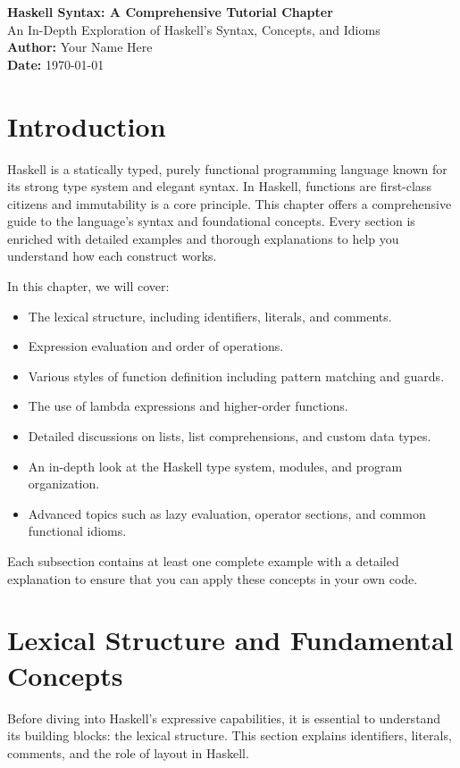 \documentclass[11pt,a4paper]{article}
\begin{document}
\begin{center}
  {\LARGE \textbf{Haskell Syntax: A Comprehensive Tutorial Chapter}}\\[1em]
  {\large An In-Depth Exploration of Haskell's Syntax, Concepts, and Idioms}\\[2em]
  \textbf{Author:} Your Name Here \\
  \textbf{Date:} \today
\end{center}

\newpage

\tableofcontents

\newpage

\section{Introduction}
Haskell is a statically typed, purely functional programming language known for its strong type system and elegant syntax. In Haskell, functions are first-class citizens and immutability is a core principle. This chapter offers a comprehensive guide to the language's syntax and foundational concepts. Every section is enriched with detailed examples and thorough explanations to help you understand how each construct works.

In this chapter, we will cover:
\begin{itemize}[noitemsep]
  \item The lexical structure, including identifiers, literals, and comments.
  \item Expression evaluation and order of operations.
  \item Various styles of function definition including pattern matching and guards.
  \item The use of lambda expressions and higher-order functions.
  \item Detailed discussions on lists, list comprehensions, and custom data types.
  \item An in-depth look at the Haskell type system, modules, and program organization.
  \item Advanced topics such as lazy evaluation, operator sections, and common functional idioms.
\end{itemize}

Each subsection contains at least one complete example with a detailed explanation to ensure that you can apply these concepts in your own code.

\section{Lexical Structure and Fundamental Concepts}
Before diving into Haskell’s expressive capabilities, it is essential to understand its building blocks: the lexical structure. This section explains identifiers, literals, comments, and the role of layout in Haskell.
\end{document}

